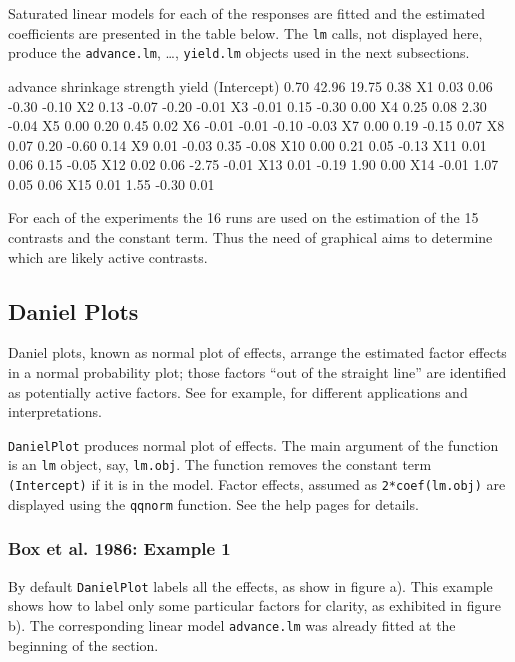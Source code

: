 \documentclass[letterpaper]{article}
\begin{document}
Saturated linear models for each of the responses are fitted and the
estimated coefficients are presented in the table below. The \texttt{lm}
calls, not displayed here, produce the \texttt{advance.lm}, \dots,
\texttt{yield.lm} objects used in the next subsections.

\begin{Schunk}
\begin{Soutput}
            advance shrinkage strength yield
(Intercept)    0.70     42.96    19.75  0.38
X1             0.03      0.06    -0.30 -0.10
X2             0.13     -0.07    -0.20 -0.01
X3            -0.01      0.15    -0.30  0.00
X4             0.25      0.08     2.30 -0.04
X5             0.00      0.20     0.45  0.02
X6            -0.01     -0.01    -0.10 -0.03
X7             0.00      0.19    -0.15  0.07
X8             0.07      0.20    -0.60  0.14
X9             0.01     -0.03     0.35 -0.08
X10            0.00      0.21     0.05 -0.13
X11            0.01      0.06     0.15 -0.05
X12            0.02      0.06    -2.75 -0.01
X13            0.01     -0.19     1.90  0.00
X14           -0.01      1.07     0.05  0.06
X15            0.01      1.55    -0.30  0.01
\end{Soutput}
\end{Schunk}

For each of the experiments the 16 runs are used on the estimation of the 15
contrasts and the constant term. Thus the need of graphical aims to determine
which are likely active contrasts.

\subsection{Daniel Plots}
Daniel plots, known as normal plot of effects, arrange the estimated factor
effects in a normal probability plot; those factors ``out of the straight
line'' are identified as potentially active factors. See for example,
\cite{Daniel-1976} for different applications and interpretations.

\texttt{DanielPlot} produces normal plot of effects. The main argument of the
function is an \texttt{lm} object, say, \texttt{lm.obj}. The function removes
the constant term \texttt{(Intercept)} if it is in the model. Factor effects,
assumed as \texttt{2*coef(lm.obj)} are displayed using the \texttt{qqnorm}
function. See the help pages for details.

\subsubsection{Box et al. 1986: Example 1}
By default \texttt{DanielPlot} labels all the effects, as show in figure a).
This example shows how to label only some particular factors for clarity, as
exhibited in figure b). The corresponding linear model \texttt{advance.lm}
was already fitted at the beginning of the section.
\end{document}
